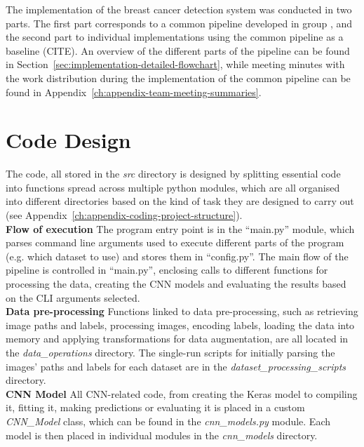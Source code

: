 The implementation of the breast cancer detection system was conducted in two parts. The first part corresponds to a common pipeline developed in group \citep{adam_jaamour_2020_3975093}, and the second part to individual implementations using the common pipeline as a baseline (CITE). An overview of the different parts of the pipeline can be found in Section~\ref{sec:implementation-detailed-flowchart}, while meeting minutes with the work distribution during the implementation of the common pipeline can be found in Appendix~\ref{ch:appendix-team-meeting-summaries}.


\section{Code Design}

The code, all stored in the \textit{src} directory is designed by splitting essential code into functions spread across multiple python modules, which are all organised into different directories based on the kind of task they are designed to carry out (see Appendix~\ref{ch:appendix-coding-project-structure}).\\

\textbf{Flow of execution} \space The program entry point is in the ``main.py'' module, which parses command line arguments used to execute different parts of the program (e.g. which dataset to use) and stores them in ``config.py''. The main flow of the pipeline is controlled in ``main.py'', enclosing calls to different functions for processing the data, creating the CNN models and evaluating the results based on the CLI arguments selected.\\

\textbf{Data pre-processing} \space Functions linked to data pre-processing, such as retrieving image paths and labels, processing images, encoding labels, loading the data into memory and applying transformations for data augmentation, are all located in the \textit{data\_operations} directory. The single-run scripts for initially parsing the images' paths and labels for each dataset are in the \textit{dataset\_processing\_scripts} directory.\\

\textbf{CNN Model} \space All CNN-related code, from creating the Keras model to compiling it, fitting it, making predictions or evaluating it is placed in a custom \textit{CNN\_Model} class, which can be found in the \textit{cnn\_models.py} module. Each model is then placed in individual modules in the \textit{cnn\_models} directory.\\


